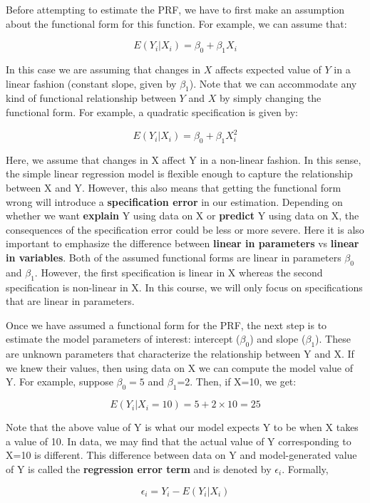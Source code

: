 \documentclass[
]{book}
\theoremstyle{definition}
\theoremstyle{definition}
\theoremstyle{definition}
\theoremstyle{definition}
\theoremstyle{remark}
\begin{document}
Before attempting to estimate the PRF, we have to first make an assumption about the functional form for this function. For example, we can assume that:

\[E(Y_i|X_i)=\beta_0 + \beta_1 X_i\]

In this case we are assuming that changes in \(X\) affects expected value of \(Y\) in a linear fashion (constant slope, given by \(\beta_1\)). Note that we can accommodate any kind of functional relationship between \(Y\) and \(X\) by simply changing the functional form. For example, a quadratic specification is given by:

\[E(Y_i|X_i)=\beta_0 + \beta_1 X_i^2\]

Here, we assume that changes in X affect Y in a non-linear fashion. In this sense, the simple linear regression model is flexible enough to capture the relationship between X and Y. However, this also means that getting the functional form wrong will introduce a \textbf{specification error} in our estimation. Depending on whether we want \textbf{explain} Y using data on X or \textbf{predict} Y using data on X, the consequences of the specification error could be less or more severe. Here it is also important to emphasize the difference between \textbf{linear in parameters} vs \textbf{linear in variables}. Both of the assumed functional forms are linear in parameters \(\beta_0\) and \(\beta_1\). However, the first specification is linear in X whereas the second specification is non-linear in X. In this course, we will only focus on specifications that are linear in parameters.

Once we have assumed a functional form for the PRF, the next step is to estimate the model parameters of interest: intercept (\(\beta_0\)) and slope (\(\beta_1\)). These are unknown parameters that characterize the relationship between Y and X. If we knew their values, then using data on X we can compute the model value of Y. For example, suppose \(\beta_0=5\) and \(\beta_1\)=2. Then, if X=10, we get:

\[E(Y_i|X_i=10)=5+2\times 10=25\]

Note that the above value of Y is what our model expects Y to be when X takes a value of 10. In data, we may find that the actual value of Y corresponding to X=10 is different. This difference between data on Y and model-generated value of Y is called the \textbf{regression error term} and is denoted by \(\epsilon_i\). Formally,

\[\epsilon_i= Y_i - E(Y_i|X_i)\]
\end{document}
